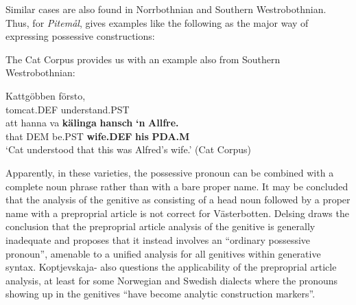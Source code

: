 Similar cases are also found in Norrbothnian and Southern Westrobothnian. Thus, for \textit{Pitemål}, \citet{Brännström1993} gives examples like the following as the major way of expressing possessive constructions:

\ea\label{}

\z 
\z

The Cat Corpus provides us with an example also from Southern Westrobothnian:


\ea\label{}
\gll Kattgöbben  försto,\\
tomcat.DEF  understand.PST\\
\gll att  hanna  va  \textbf{kälinga} \textbf{hansch} \textbf{‘n} \textbf{Allfre.}\\
that  DEM  be.PST  \textbf{wife.DEF} \textbf{his} \textbf{PDA.M} \\
\glt ‘Cat understood that this was Alfred’s wife.’ (Cat Corpus)
\z

Apparently, in these varieties, the possessive pronoun can be combined with a complete noun phrase rather than with a bare proper name. It may be concluded that the analysis of the genitive as consisting of a head noun followed by a proper name with a preproprial article is not correct for Västerbotten.  Delsing draws the conclusion that the preproprial article analysis of the genitive is generally inadequate and proposes that it instead involves an “ordinary possessive pronoun”, amenable to a unified analysis for all genitives within generative syntax. Koptjevskaja-\citet{Tamm2003} also questions the applicability of the preproprial article analysis, at least for some Norwegian and Swedish dialects where the pronouns showing up in the genitives “have become analytic construction markers”. 

